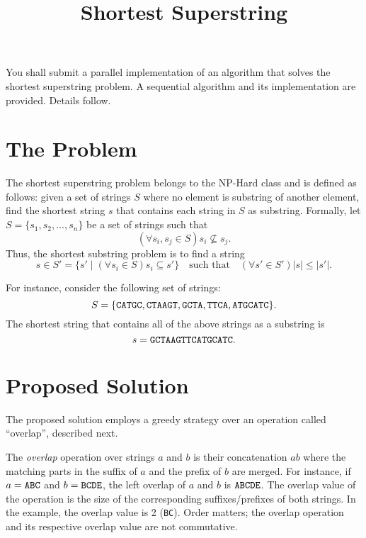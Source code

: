 \documentclass[a4paper]{article}
\title{Shortest Superstring}
\begin{document}
\maketitle

You shall submit a parallel implementation of an algorithm that solves the shortest superstring problem.
A sequential algorithm and its implementation are provided.
Details follow.

\section{The Problem}
The shortest superstring problem belongs to the NP-Hard class and is defined as follows: given a set of strings $S$ where no element is substring of another element, find the shortest string $s$ that contains each string in $S$ as substring.
Formally, let $S = \{s_1, s_2, \dots, s_n\}$ be a set of strings such that
$$
    (\forall s_i, s_j \in S) s_i \not\subseteq s_j .
$$
Thus, the shortest substring problem is to find a string
$$
s \in S' = \{s' \mid (\forall s_i \in S) s_i \subseteq s'\} \quad \mbox{such that} \quad (\forall s' \in S') |s| \leq |s'| .
$$

For instance, consider the following set of strings:
$$
    S = \{\mbox{\tt CATGC}, \mbox{\tt CTAAGT}, \mbox{\tt GCTA}, \mbox{\tt TTCA}, \mbox{\tt ATGCATC}\} .
$$
The shortest string that contains all of the above strings as a substring is
$$
    s = \mbox{\tt GCTAAGTTCATGCATC}.
$$

\section{Proposed Solution}

The proposed solution employs a greedy strategy over an operation called ``overlap'', described next.

The \emph{overlap} operation over strings $a$ and $b$ is their concatenation $ab$ where the matching parts in the suffix of $a$ and the prefix of $b$ are merged.
For instance, if $a = \mbox{\tt ABC}$ and $b = \mbox{\tt BCDE}$, the left overlap of $a$ and $b$ is $\mbox{\tt ABCDE}$.
The overlap value of the operation is the size of the corresponding suffixes/prefixes of both strings.
In the example, the overlap value is 2 ({\tt BC}).
Order matters; the overlap operation and its respective overlap value are not commutative.
\end{document}
